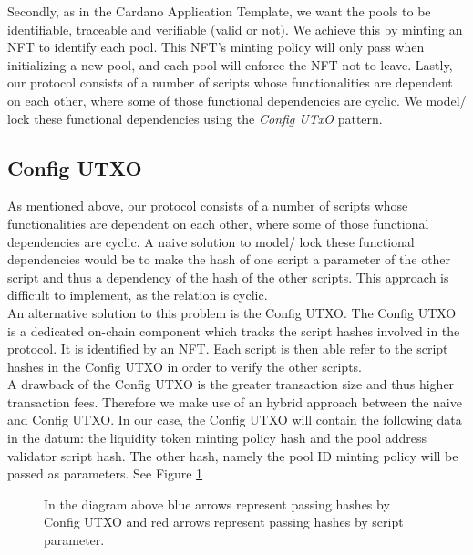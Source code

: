 \documentclass{article}
\begin{document}
Secondly, as in the Cardano Application Template, we want the pools to be
identifiable, traceable and verifiable (valid or not).
We achieve this by minting an NFT to identify each pool.
This NFT's minting policy will only pass when initializing a new pool, and each pool will enforce the NFT not to leave.
Lastly, our protocol consists of a number of scripts whose functionalities are dependent
on each other, where some of those functional dependencies are cyclic. We model/ lock these
functional dependencies using the \textit{Config UTxO} pattern.

\subsection{Config UTXO}

As mentioned above, our protocol consists of a number of scripts whose functionalities are dependent on each other,
where some of those functional dependencies are cyclic.
A naive solution to model/ lock these functional dependencies would be to
make the hash of one script a parameter of the other script and thus a dependency of the hash of the other scripts.
This approach is difficult to implement, as the relation is cyclic. \\

An alternative solution to this problem is the Config UTXO.
The Config UTXO is a dedicated on-chain component which tracks the script hashes involved in the protocol.
It is identified by an NFT. Each script is then able refer to the script
hashes in the Config UTXO in order to verify the other
scripts. \\

A drawback of the Config UTXO is the greater transaction size and thus higher transaction fees.
Therefore we make use of an hybrid approach between the naive and Config UTXO.
In our case, the Config UTXO will contain the following data in the datum:
the liquidity token minting policy hash and the pool address validator script hash.
The other hash, namely the pool ID minting policy will be passed as parameters. See Figure \ref{hashGraph}  \\

\begin{figure}
  \caption{
	  In the diagram above blue arrows represent passing hashes by
	  Config UTXO and red arrows represent passing hashes by script parameter.
  }
  \label{hashGraph}
\end{figure}
\end{document}
